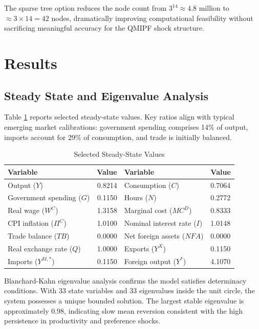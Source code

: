 \documentclass[12pt]{article}
\begin{document}
The sparse tree option reduces the node count from $3^{14} \approx 4.8$ million to $\approx 3 \times 14 = 42$ nodes, dramatically improving computational feasibility without sacrificing meaningful accuracy for the QMIPF shock structure.

\section{Results}\label{sec:results}

\subsection{Steady State and Eigenvalue Analysis}

Table \ref{tab:steady_state} reports selected steady-state values. Key ratios align with typical emerging market calibrations: government spending comprises 14\% of output, imports account for 29\% of consumption, and trade is initially balanced.

\begin{table}[H]
\centering
\caption{Selected Steady-State Values}\label{tab:steady_state}
\small
\begin{tabular}{lrll}
\toprule
\textbf{Variable} & \textbf{Value} & \textbf{Variable} & \textbf{Value} \\
\midrule
Output ($Y$) & 0.8214 & Consumption ($C$) & 0.7064 \\
Government spending ($G$) & 0.1150 & Hours ($N$) & 0.2772 \\
Real wage ($W^C$) & 1.3158 & Marginal cost ($MC^D$) & 0.8333 \\
CPI inflation ($\Pi^C$) & 1.0100 & Nominal interest rate ($I$) & 1.0148 \\
Trade balance ($TB$) & 0.0000 & Net foreign assets ($NFA$) & 0.0000 \\
Real exchange rate ($Q$) & 1.0000 & Exports ($Y^X$) & 0.1150 \\
Imports ($Y^{M,*}$) & 0.1150 & Foreign output ($Y^*$) & 4.1070 \\
\bottomrule
\end{tabular}
\end{table}

Blanchard-Kahn eigenvalue analysis confirms the model satisfies determinacy conditions. With 33 state variables and 33 eigenvalues inside the unit circle, the system possesses a unique bounded solution. The largest stable eigenvalue is approximately 0.98, indicating slow mean reversion consistent with the high persistence in productivity and preference shocks.
\end{document}
